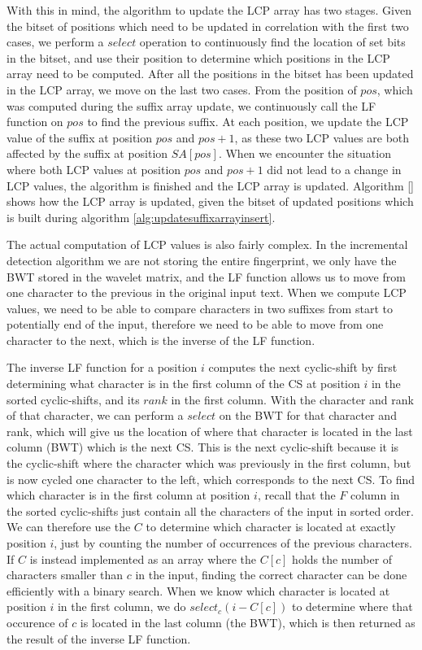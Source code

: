 With this in mind, the algorithm to update the LCP array has two stages. Given the bitset
of positions which need to be updated in correlation with the first two cases, we perform
a $select$ operation to continuously find the location of set bits in the bitset, and use
their position to determine which positions in the LCP array need to be computed. After
all the positions in the bitset has been updated in the LCP array, we move on the last two
cases. From the position of $pos$, which was computed during the suffix array update, we
continuously call the LF function on $pos$ to find the previous suffix. At each position,
we update the LCP value of the suffix at position $pos$ and $pos + 1$, as these two LCP
values are both affected by the suffix at position $SA[pos]$. When we encounter the
situation where both LCP values at position $pos$ and $pos + 1$ did not lead to a change
in LCP values, the algorithm is finished and the LCP array is updated. Algorithm \ref{}
shows how the LCP array is updated, given the bitset of updated positions which is built
during algorithm \ref{alg:updatesuffixarrayinsert}.

The actual computation of LCP values is also fairly complex. In the incremental detection
algorithm we are not storing the entire fingerprint, we only have the BWT stored in the
wavelet matrix, and the LF function allows us to move from one character to the previous
in the original input text. When we compute LCP values, we need to be able to compare
characters in two suffixes from start to potentially end of the input, therefore we need
to be able to move from one character to the next, which is the inverse of the LF
function. 

The inverse LF function for a position $i$ computes the next cyclic-shift by first
determining what character is in the first column of the CS at position $i$ in the sorted
cyclic-shifts, and its $rank$ in the first column. With the character and rank of that
character, we can perform a $select$ on the BWT for that character and rank, which will
give us the location of where that character is located in the last column (BWT) which is
the next CS. This is the next cyclic-shift because it is the cyclic-shift where the
character which was previously in the first column, but is now cycled one character to the
left, which corresponds to the next CS. To find which character is in the first column at
position $i$, recall that the $F$ column in the sorted cyclic-shifts just contain all the
characters of the input in sorted order. We can therefore use the $C$ to determine which
character is located at exactly position $i$, just by counting the number of occurrences
of the previous characters. If $C$ is instead implemented as an array where the $C[c]$
holds the number of characters smaller than $c$ in the input, finding the correct
character can be done efficiently with a binary search. When we know which character is
located at position $i$ in the first column, we do $select_c(i - C[c])$ to determine where
that occurence of $c$ is located in the last column (the BWT), which is then returned as
the result of the inverse LF function.

